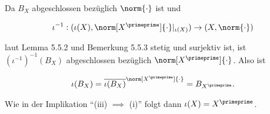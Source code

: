 \begin{solution}
\begin{itemize}

  Da $B_X$ abgeschlossen bezüglich $\norm{\cdot}$ ist und

  \begin{align*}
    \iota^{-1}:
    (\iota(X), \norm[X^\primeprime]{\cdot}|_{\iota(X)})
    \to
    (X, \norm{\cdot})
  \end{align*}

  laut Lemma 5.5.2 und Bemerkung 5.5.3 stetig und surjektiv ist, ist $(\iota^{-1})^{-1}(B_X)$ abgeschlossen bezüglich $\norm[X^\primeprime]{\cdot}$.
  Also ist

  \begin{align*}
    \iota(B_X)
    =
    \overline{\iota(B_X)}^{\norm[X^\primeprime]{\cdot}}
    =
    B_{X^\primeprime}.
  \end{align*}

  Wie in der Implikation \enquote{(iii) $\implies$ (i)} folgt dann $\iota(X) = X^\primeprime$.

\end{itemize}

\end{solution}
